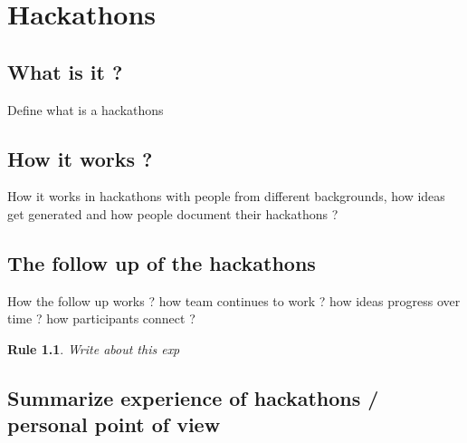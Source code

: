 \chapter{Hackathons}
\theoremstyle{plain}
\theoremsymbol{}
\newtheorem{Rule}[theorem]{Rule}

\section{What is it ?}
Define what is a hackathons
\section{How it works ?}
How it works in hackathons with people from different backgrounds, how ideas get generated and how people document their hackathons ?

\section{The follow up of the hackathons}
How the follow up works ? how team continues to work ? how ideas progress over time ? how participants connect ?
\begin{Rule}
	Write about this exp
\end{Rule}

\section{Summarize experience of hackathons / personal point of view}
